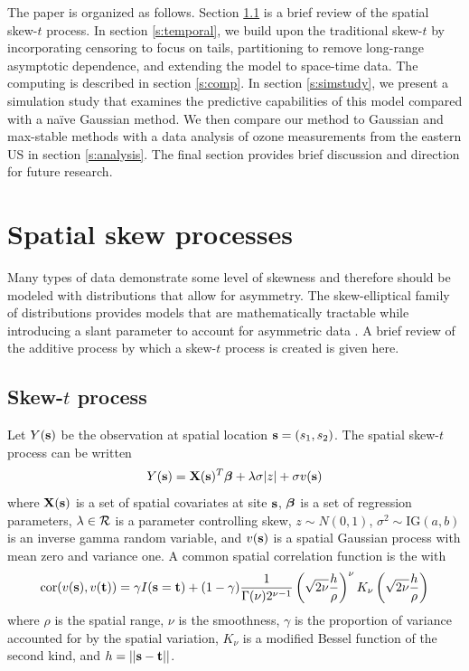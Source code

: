\documentclass[11pt]{article}
\begin{document}
The paper is organized as follows.
Section \ref{s:skewt} is a brief review of the spatial skew-$t$ process.
In section \ref{s:temporal}, we build upon the traditional skew-$t$ by incorporating censoring to focus on tails, partitioning to remove long-range asymptotic dependence, and extending the model to space-time data.
The computing is described in section \ref{s:comp}.
In section \ref{s:simstudy}, we present a simulation study that examines the predictive capabilities of this model compared with a na{\"i}ve Gaussian method.
We then compare our method to Gaussian and max-stable methods with a data analysis of ozone measurements from the eastern US in section \ref{s:analysis}.
The final section provides brief discussion and direction for future research.

\section{Spatial skew processes}\label{s:spatialskew}
Many types of data demonstrate some level of skewness and therefore should be modeled with distributions that allow for asymmetry.
The skew-elliptical family of distributions provides models that are mathematically tractable while introducing a slant parameter to account for asymmetric data \citep{Genton2004}.
A brief review of the additive process by which a skew-$t$ process is created is given here.

\subsection{Skew-$t$ process} \label{s:skewt}
Let $Y(\mbox{\bf s})$ be the observation at spatial location $\mbox{\bf s} = (s_1, s_2)$.
The spatial skew-$t$ process can be written
\begin{align}
  Y(\mbox{\bf s}) = \mbox{\bf X}(\mbox{\bf s})^T \mbox{\boldmath $\beta$} + \lambda \sigma |z| + \sigma v(\mbox{\bf s})
\end{align}
where $\mbox{\bf X}(\mbox{\bf s})$ is a set of spatial covariates at site $\mbox{\bf s}$, $\mbox{\boldmath $\beta$}$ is a set of regression parameters, $\lambda \in {\cal R}$ is a parameter controlling skew, $z \sim N(0, 1)$, $\sigma^2 \sim \text{IG}(a, b)$ is an inverse gamma random variable, and $v(\mbox{\bf s})$ is a spatial Gaussian process with mean zero and variance one.
A common spatial correlation function is the \Matern with
\begin{align}
  \text{cor}(v(\mbox{\bf s}), v(\mbox{\bf t})) = \gamma I(\mbox{\bf s} = \mbox{\bf t}) + (1 - \gamma)  \frac{ 1 }{ \Gamma(\nu) 2^{ \nu - 1}} \left( \sqrt{2\nu} \frac{ h }{ \rho } \right)^{\nu} K_{\nu} \left( \sqrt{2\nu} \frac{ h }{ \rho } \right) \label{eq:matern}
\end{align}
where $\rho$ is the spatial range, $\nu$ is the smoothness, $\gamma$ is the proportion of variance accounted for by the spatial variation, $K_\nu$ is a modified Bessel function of the second kind, and $h = || \mbox{\bf s} - \mbox{\bf t} ||$.
\end{document}
